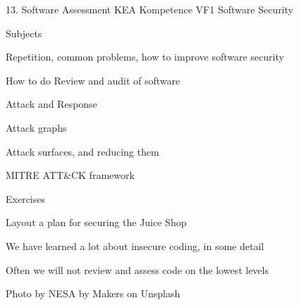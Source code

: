 \documentclass[Screen16to9,17pt]{foils}
\begin{document}
\mytitlepage
{13. Software Assessment}
{KEA Kompetence VF1 Software Security}


\begin{list1}
\item Subjects
\begin{list2}
\item Repetition, common problems, how to improve software security
\item How to do Review and audit of software
\item Attack and Response
\item Attack graphs
\item Attack surfaces, and reducing them
\item MITRE ATT\&CK framework
\end{list2}
\item Exercises
\begin{list2}
\item Layout a plan for securing the Juice Shop
\end{list2}
\end{list1}






\begin{list1}
\item We have learned a lot about insecure coding, in some detail
\item Often we will not review and assess code on the lowest levels
\end{list1}

\hfill {\small Photo by NESA by Makers on Unsplash}
\end{document}
